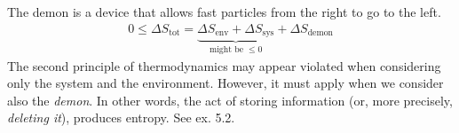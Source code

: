 \documentclass[../template.tex]{subfiles}
\begin{document}
The demon is a device that allows fast particles from the right to go to the left. 
\begin{align*}
    0 \leq \Delta S_{\mathrm{tot}} = \underbrace{\Delta S_{\mathrm{env}} + \Delta S_{\mathrm{sys} }}_{\text{might be $\leq 0$}}  + \Delta S_{\mathrm{demon}}
\end{align*}
The second principle of thermodynamics may appear violated when considering only the system and the environment. However, it must apply when we consider also the \textit{demon}. In other words, the act of storing information (or, more precisely, \textit{deleting it}), produces entropy. 
See ex. 5.2.
\end{document}
